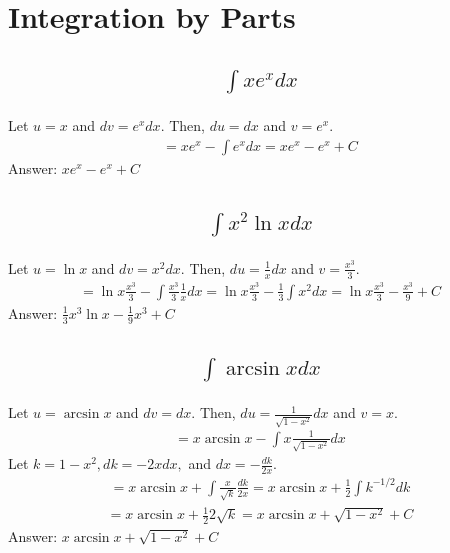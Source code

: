 \documentclass{article}
\begin{document}
\section{Integration by Parts}
\subsection{
	\begin{align*}
		\int{xe^x dx}
	\end{align*}
}
Let $u = x$ and $dv = e^x dx$. Then, $du = dx$ and $v = e^x$.
\begin{align*}
	= x e^x - \int{e^x dx} = x e^x - e^x + C
\end{align*}
Answer: $x e^x - e^x + C$

\subsection{
	\begin{align*}
		\int{x^2 \ln{x} dx}
	\end{align*}
}
Let $u = \ln{x}$ and $dv = x^2 dx$. Then, $du = \frac{1}{x} dx$ and $v = \frac{x^3}{3}$.
\begin{align*}
	= \ln{x} \frac{x^3}{3} - \int{\frac{x^3}{3} \frac{1}{x} dx} = \ln{x} \frac{x^3}{3} - \frac{1}{3} \int{x^2 dx} = \ln{x} \frac{x^3}{3} - \frac{x^3}{9} + C
\end{align*}
Answer: $\frac{1}{3} x^3 \ln{x} - \frac{1}{9} x^3 + C$

\subsection{
	\begin{align*}
		\int{\arcsin{x} dx}
	\end{align*}
}
Let $u = \arcsin{x}$ and $dv = dx$. Then, $du = \frac{1}{\sqrt{1 - x^2}}dx$ and $v = x$.
\begin{align*}
	= x \arcsin{x} - \int{x \frac{1}{\sqrt{1 - x^2}} dx}
\end{align*}
Let $k = 1 - x^2, dk = -2xdx,$ and $dx = -\frac{dk}{2x}$. 
\begin{align*}
	= x \arcsin{x} + \int{\frac{x}{\sqrt{k}} \frac{dk}{2x}} = x \arcsin{x} + \frac{1}{2} \int{k^{-1/2} dk}
\end{align*}
\begin{align*}
	= x \arcsin{x} + \frac{1}{2} 2\sqrt{k} = x \arcsin{x} + \sqrt{1 - x^2} + C
\end{align*}
Answer: $x \arcsin{x} + \sqrt{1 - x^2} + C$
\end{document}
